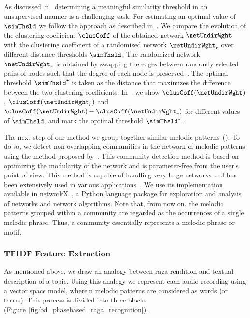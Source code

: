 As discussed in~ determining a meaningful similarity threshold in an unsupervised manner is a challenging task. For estimating an optimal value of $\simThsld$ we follow the approach as described in~. We compare the evolution of the clustering coefficient $\clusCoff$ of the obtained network $\netUndirWght$ with the clustering coefficient of a randomized network $\netUndirWght_r$ over different distance thresholds $\simThsld$. The randomized network $\netUndirWght_r$ is obtained by swapping the edges between randomly selected pairs of nodes such that the degree of each node is preserved~\citep{maslov2002specificity}. The optimal threshold $\simThsld^\star$ is taken as the distance that maximizes the difference between the two clustering coefficients.  In~, we show $\clusCoff(\netUndirWght)$, $\clusCoff(\netUndirWght_r)$ and $\clusCoff(\netUndirWght)-\clusCoff(\netUndirWght_r)$ for different values of $\simThsld$, and mark the optimal threshold $\simThsld^\star$.

The next step of our method we group together similar melodic patterns~(). To do so, we detect non-overlapping communities in the network of melodic patterns using the method proposed by~\cite{blondel2008fast}. This community detection method is based on optimizing the modularity of the network and is parameter-free from the user's point of view. This method is capable of handling very large networks and has been extensively used in various applications~\citep{fortunato2010community}. We use its implementation available in networkX~\citep{hagberg-2008-exploring}, a Python language package for exploration and analysis of networks and network algorithms. Note that, from now on, the melodic patterns grouped within a community are regarded as the occurrences of a single melodic phrase. Thus, a community essentially represents a melodic phrase or motif.


\subsubsection{TFIDF Feature Extraction}
\label{sec:vsm_feature_extraction_TFID_computation}

As mentioned above, we draw an analogy between \gls{raga} rendition and textual description of a topic. Using this analogy we represent each audio recording using a vector space model, wherein melodic patterns are considered as words (or terms). This process is divided into three blocks (Figure~\ref{fig:bd_phasebased_raga_recognition}).


